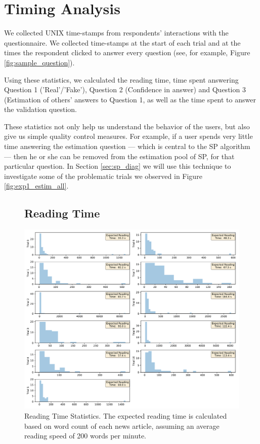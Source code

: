\documentclass{report}
\theoremstyle{definition}
\begin{document}
\section{Timing Analysis}
We collected UNIX time-stamps from respondents' interactions with the questionnaire. We collected time-stamps at the start of each trial and at the times the respondent clicked to answer every question (see, for example, Figure \ref{fig:sample_question}). 

Using these statistics, we calculated the reading time, time spent answering Question 1 ('Real'/'Fake'), Question 2 (Confidence in answer) and Question 3 (Estimation of others' answers to Question 1, as well as the time spent to answer the validation question.

These statistics not only help us understand the behavior of the users, but also give us simple quality control measures. For example, if a user spends very little time answering the estimation question --- which is central to the SP algorithm --- then he or she can be removed from the estimation pool of SP, for that particular question. In Section \ref{sec:sp_diag} we will use this technique to investigate some of the problematic trials we observed in Figure \ref{fig:exp1_estim_all}.

\begin{figure}[H]
\hspace*{-3cm}
\begin{minipage}{1.5\linewidth}
\subsection{Reading Time}
    \centering
    \centerline{
    \includegraphics[width=\textwidth]{exp1_stats_reading.pdf}}
    \caption{Reading Time Statistics. The expected reading time is calculated based on word count of each news article, assuming an average reading speed of 200 words per minute.}
    \label{fig:exp1_stats_reading}
\end{minipage}
\end{figure}
\end{document}
